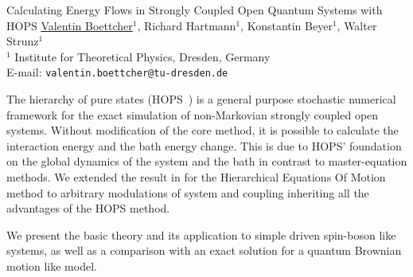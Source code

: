 \documentclass[fontsize=12pt,paper=a4,
captions=nooneline,captions=tableabove,english,final,parskip=none,titlepage=false]{scrartcl}
\begin{document}
\begin{center}
  \Large
  Calculating Energy Flows in Strongly Coupled Open Quantum Systems with
  HOPS
  \vspace{16pt}
  \small \underline{Valentin Boettcher}$^1$, Richard Hartmann$^1$,
  Konstantin Beyer$^1$, Walter Strunz$^1$
  \\
  $^1$ Institute for Theoretical Physics, Dresden, Germany\\
  E-mail: \texttt{valentin.boettcher@tu-dresden.de}\\
  \vspace{8pt}
\end{center}
\normalsize
The hierarchy of pure states
(HOPS~\cite{Hartmann2017Dec,Diosi1998Mar}) is a general purpose
stochastic numerical framework for the exact simulation of
non-Markovian strongly coupled open systems. Without modification of
the core method, it is possible to calculate the interaction energy
and the bath energy change. This is due to HOPS' foundation on the
global dynamics of the system and the bath in contrast to
master-equation methods. We extended the result in 
for the Hierarchical Equations Of Motion method to arbitrary
modulations of system and coupling inheriting all the advantages of
the HOPS method.

We present the basic theory and its application to simple driven
spin-boson like systems, as well as a comparison with an exact
solution for a quantum Brownian motion like model.
\begin{figure}[H]
  \centering
  {}
\end{figure}
\printbibliography{}
\end{document}
